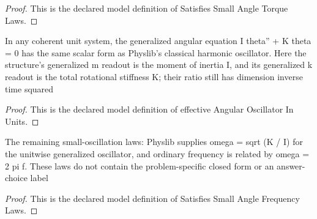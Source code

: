 \begin{proof}
  This is the declared model definition of Satisfies Small Angle Torque Laws.
\end{proof}
\begin{definition}
  \label{def:physics:phyx-mini-0233:phyxminiproblems-problemphyxmini0233-effectiveangularoscillatorinunits}
  In any coherent unit system, the generalized angular equation I theta'' + K theta = 0 has the same scalar form as Physlib's classical harmonic oscillator. Here the structure's generalized m readout is the moment of inertia I, and its generalized k readout is the total rotational stiffness K; their ratio still has dimension inverse time squared
\end{definition}
\begin{proof}
  This is the declared model definition of effective Angular Oscillator In Units.
\end{proof}
\begin{definition}
  \label{def:physics:phyx-mini-0233:phyxminiproblems-problemphyxmini0233-satisfiessmallanglefrequencylaws}
  The remaining small-oscillation laws: Physlib supplies omega = sqrt (K / I) for the unitwise generalized oscillator, and ordinary frequency is related by omega = 2 pi f. These laws do not contain the problem-specific closed form or an answer-choice label
\end{definition}
\begin{proof}
  This is the declared model definition of Satisfies Small Angle Frequency Laws.
\end{proof}
